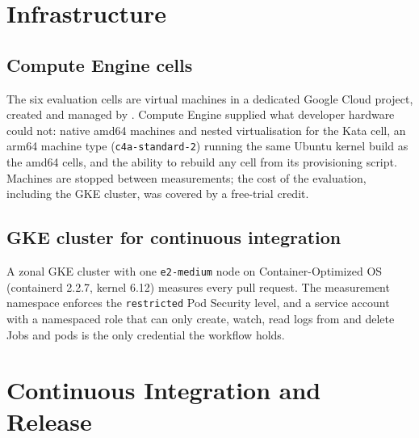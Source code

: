 \section{Infrastructure}

\subsection{Compute Engine cells}
The six evaluation cells are virtual machines in a dedicated Google Cloud project, created and managed by . Compute Engine supplied what developer hardware could not: native amd64 machines and nested virtualisation for the Kata cell, an arm64 machine type (\texttt{c4a-standard-2}) running the same Ubuntu kernel build as the amd64 cells, and the ability to rebuild any cell from its provisioning script. Machines are stopped between measurements; the cost of the evaluation, including the GKE cluster, was covered by a free-trial credit.

\subsection{GKE cluster for continuous integration}
A zonal GKE cluster with one \texttt{e2-medium} node on Container-Optimized OS (containerd 2.2.7, kernel 6.12) measures every pull request. The measurement namespace enforces the \texttt{restricted} Pod Security level, and a service account with a namespaced role that can only create, watch, read logs from and delete Jobs and pods is the only credential the workflow holds.

\section{Continuous Integration and Release}

